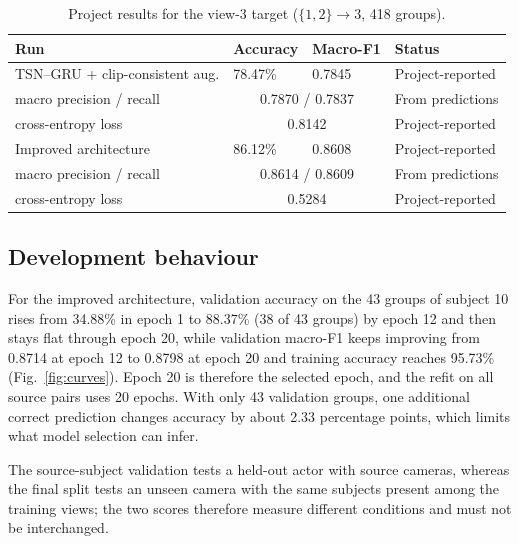 \documentclass[runningheads]{llncs}
\begin{document}
\begin{table}[tb]
\caption{Project results for the view-3 target ($\{1,2\}\to3$, 418 groups).}\label{tab:proj}
\centering\small
\begin{tabular}{@{}p{4.9cm}p{1.6cm}p{1.6cm}p{3.1cm}@{}}
\toprule
Run & Accuracy & Macro-F1 & Status\\\midrule
TSN--GRU + clip-consistent aug. & 78.47\% & 0.7845 & Project-reported\\
\quad macro precision / recall & \multicolumn{2}{c}{0.7870 / 0.7837} & From predictions\\
\quad cross-entropy loss & \multicolumn{2}{c}{0.8142} & Project-reported\\
Improved architecture & 86.12\% & 0.8608 & Project-reported\\
\quad macro precision / recall & \multicolumn{2}{c}{0.8614 / 0.8609} & From predictions\\
\quad cross-entropy loss & \multicolumn{2}{c}{0.5284} & Project-reported\\\bottomrule
\end{tabular}
\end{table}

\subsection{Development behaviour}
For the improved architecture, validation accuracy on the 43 groups of subject 10 rises from 34.88\% in epoch 1 to 88.37\% (38 of 43 groups) by epoch 12 and then stays flat through epoch 20, while validation macro-F1 keeps improving from 0.8714 at epoch 12 to 0.8798 at epoch 20 and training accuracy reaches 95.73\% (Fig.~\ref{fig:curves}). Epoch 20 is therefore the selected epoch, and the refit on all source pairs uses 20 epochs. With only 43 validation groups, one additional correct prediction changes accuracy by about 2.33 percentage points, which limits what model selection can infer.

The source-subject validation tests a held-out actor with source cameras, whereas the final split tests an unseen camera with the same subjects present among the training views; the two scores therefore measure different conditions and must not be interchanged.
\end{document}
